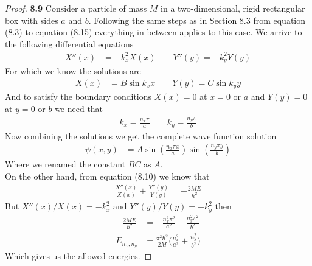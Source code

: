 \documentclass[11pt]{article}
\theoremstyle{definition}
\begin{document}
\cleardoublepage
\begin{proof}{\textbf{8.9}}
Consider a particle of mass $M$ in a two-dimensional, rigid rectangular box
with sides $a$ and $b$. Following the same steps as in Section 8.3 from
equation (8.3) to equation (8.15) everything in between applies to this case.
We arrive to the following differential equations
\begin{align*}
    X''(x) &= -k_x^2 X(x)\qquad
    Y''(y) = -k_y^2 Y(y)
\end{align*}
For which we know the solutions are
\begin{align*}
    X(x) &= B\sin k_x x\qquad
    Y(y) = C\sin k_y y
\end{align*}
And to satisfy the boundary conditions $X(x) = 0$ at $x = 0\text{ or }a$ and
$Y(y) = 0$ at $y=0 \text{ or } b$ we need that
\begin{align*}
    k_x = \frac{n_x\pi}{a}\qquad
    k_y = \frac{n_y\pi}{b}
\end{align*}
Now combining the solutions we get the complete wave function solution
\begin{align*}
    \psi(x,y) &= A\sin(\frac{n_x \pi x}{a})\sin(\frac{n_y \pi y}{b})
\end{align*}
Where we renamed the constant $BC$ as $A$.
\\
On the other hand, from equation (8.10) we know that
\begin{align*}
    \frac{X''(x)}{X(x)} + \frac{Y''(y)}{Y(y)} = -\frac{2ME}{\hbar^2}
\end{align*}
But $X''(x)/X(x) = -k_x^2$ and $Y''(y)/Y(y) = -k_y^2$ then
\begin{align*}
    -\frac{2ME}{\hbar^2} &= -\frac{n_x^2\pi^2}{a^2} -\frac{n_y^2\pi^2}{b^2}\\
    E_{n_x, n_y}
    &= \frac{\pi^2\hbar^2}{2M}\bigg(\frac{n_x^2}{a^2} + \frac{n_y^2}{b^2}\bigg)
\end{align*}
Which gives us the allowed energies.
\end{proof}
\end{document}
